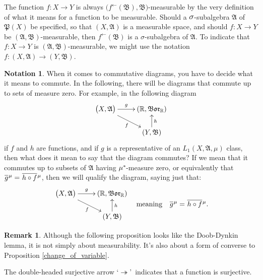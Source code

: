 \documentclass[
twoside=true,
paper=letter,
fontsize=9pt,
pagesize=auto,
leqno,
openany,
headsepline,
overfullrule,
]{scrbook}
\theoremstyle{plain}
\theoremstyle{plain}
\theoremstyle{definition}
\newtheorem{rmk}[thm]{Remark}
\newtheorem{notn}[thm]{Notation}
\theoremstyle{bfnoteitalic}
\theoremstyle{bfnoteroman}
\newcommand{\sigalg}[1]{\mathfrak{#1}}
\newcommand{\borel}{\mathfrak{Bor}}
\newcommand{\textsigma}{\hbox{\large{$\sigma$}}\kern-1pt}
\newcommand{\preimage}[1]{#1^{\leftarrow}}
\newcommand{\R}{\mathbb{R}}
\newcommand{\sigmaalgebra}{\sigalg{A}}
\newcommand{\sigmaalgebraii}{\sigalg{B}}
\newcommand{\powerset}{\mathfrak{P}}
\newcommand{\kernast}{\ast\kern-1pt}
\newcommand{\Pstar}{\measure^\kernast}
\newcommand{\Lone}{L_1(\measurespace, \sigmaalgebra, \measure)}
\newcommand{\measurespace}{X}
\newcommand{\measurespaceii}{Y}
\newcommand{\measure}{\mu}
\newcommand*\xbar[1]{%
   \hbox{%
     \vbox{%
       \hrule height 0.4pt %
       \kern0.4ex%
       \hbox{%
         \ensuremath{#1}%
       }%
     }%
   }%
}
\newcommand{\lebclass}[1]{\hspace{.5pt}\xbar{#1}\hspace{0.5pt}}
\newcommand{\ellclass}[2]{\lebclass{#1}^{#2}}
\begin{document}
The function $f: \measurespace\to\measurespaceii$ is always
$\bigl(\preimage{f}(\sigmaalgebraii), \sigmaalgebraii\bigr)$\hyp{}measurable by the very definition of what it means for a function to be measurable.
Should a $\textsigma$-subalgebra $\sigmaalgebra$ of $\powerset(\measurespace)$ be specified, so that $(\measurespace, \sigmaalgebra)$ is a measurable space, and should $f:\measurespace\to\measurespaceii$ be 
$(\sigmaalgebra, \sigmaalgebraii)$\hyp{}measurable, then $\preimage{f}(\sigmaalgebraii)$ is a \textsigma-subalgebra of $\sigmaalgebra$. 
To indicate that $f:\measurespace\to\measurespaceii$ is 
$(\sigmaalgebra, \sigmaalgebraii)$\hyp{}measurable, we might use the notation $f:(\measurespace,\sigmaalgebra)\to(\measurespaceii,\sigmaalgebraii)$.



\begin{notn}
When it comes to commutative diagrams, you have to decide what it means to commute.  In the following, there will be diagrams that commute up to sets of measure zero.  For example, in the following diagram
\[
\xymatrix@R=16pt{ 
\bigl( \measurespace, \sigmaalgebra \bigr) \ar[r]^-{g} 
\ar[dr]_{f}
&
(\R,\borel_\R)  
\\
&
(\measurespaceii, \sigmaalgebraii) \ar[u]_{h}
\\
}
\]
if $f$ and $h$ are functions, and if $g$ is a representative of an 
$\Lone$ class, then what does it mean to say that the diagram commutes? If we mean that it commutes up to subsets of $\sigmaalgebra$ having $\Pstar$-measure zero, or equivalently that 
$\ellclass{g}{\measure}=\ellclass{h\circ f}{\measure}$, then we will qualify the diagram, saying just that:
\[
\begin{gathered}
\xymatrix@R=16pt{ 
\bigl( \measurespace, \sigmaalgebra \bigr) \ar[r]^-{g} 
\ar[dr]_{f}
&
(\R,\borel_\R)  
\\
&
(\measurespaceii, \sigmaalgebraii) \ar[u]_{h}
\\
}
\end{gathered}
\quad
\text{meaning}
\quad
\ellclass{g}{\measure}=\ellclass{h\circ f}{\measure}.
\]
\end{notn}


\begin{rmk}
Although the following proposition looks like the Doob-Dynkin lemma, it is not simply about measurability. It's also about a form of converse to Proposition \ref{change_of_variable}.

The double-headed surjective arrow \lq$\twoheadrightarrow$\rq\ indicates that a function is surjective.
\end{rmk}
\end{document}
